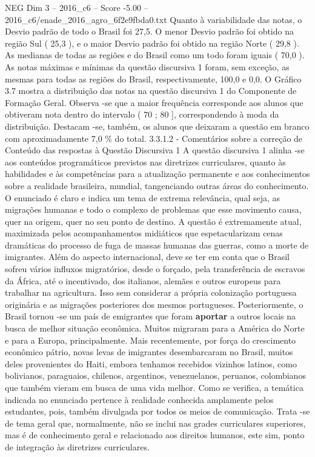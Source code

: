 \begin{textsample}{NEG Dim 3 – 2016\_c6 – Score -5.00 – 2016\_c6/enade\_2016\_agro\_6f2e9fbda0.txt}
Quanto à variabilidade das notas, o Desvio padrão de todo o Brasil foi 27,5.
O menor Desvio padrão foi obtido na região Sul ( 25,3 ), e o maior Desvio padrão foi obtido na região Norte ( 29,8 ).
As medianas de todas as regiões e do Brasil como um todo foram iguais ( 70,0 ).
As notas máximas e mínimas da questão discursiva 1 foram, sem exceção, as mesmas para todas as regiões do Brasil, respectivamente, 100,0 e 0,0.
O Gráfico 3.7 mostra a distribuição das notas na questão discursiva 1 do Componente de Formação Geral.
Observa -se que a maior frequência corresponde aos alunos que obtiveram nota dentro do intervalo ( 70 ; 80 ], correspondendo à moda da distribuição.
Destacam -se, também, os alunos que deixaram a questão em branco com aproximadamente 7,0 \% do total. 3.3.1.2 - Comentários sobre a correção de Conteúdo das respostas à Questão Discursiva 1 A questão discursiva 1 alinha -se aos conteúdos programáticos previstos nas diretrizes curriculares, quanto às habilidades e às competências para a atualização permanente e aos conhecimentos sobre a realidade brasileira, mundial, tangenciando outras áreas do conhecimento.
O enunciado é claro e indica um tema de extrema relevância, qual seja, as migrações humanas e todo o complexo de problemas que esse movimento causa, quer na origem, quer no seu ponto de destino.
A questão é extremamente atual, maximizada pelos acompanhamentos midiáticos que espetacularizam cenas dramáticas do processo de fuga de massas humanas das guerras, como a morte de imigrantes.
Além do aspecto internacional, deve se ter em conta que o Brasil sofreu vários influxos migratórios, desde o forçado, pela transferência de escravos da África, até o incentivado, dos italianos, alemães e outros europeus para trabalhar na agricultura.
Isso sem considerar a própria colonização portuguesa originária e as migrações posteriores dos mesmos portugueses.
Posteriormente, o Brasil tornou -se um país de emigrantes que foram \textbf{aportar} a outros locais na busca de melhor situação econômica.
Muitos migraram para a América do Norte e para a Europa, principalmente.
Mais recentemente, por força do crescimento econômico pátrio, novas levas de imigrantes desembarcaram no Brasil, muitos deles provenientes do Haiti, embora tenhamos recebidos vizinhos latinos, como bolivianos, paraguaios, chilenos, argentinos, venezuelanos, peruanos, colombianos que também vieram em busca de uma vida melhor.
Como se verifica, a temática indicada no enunciado pertence à realidade conhecida amplamente pelos estudantes, pois, também divulgada por todos os meios de comunicação.
Trata -se de tema geral que, normalmente, não se inclui nas grades curriculares superiores, mas é de conhecimento geral e relacionado aos direitos humanos, este sim, ponto de integração às diretrizes curriculares.

\end{textsample}
